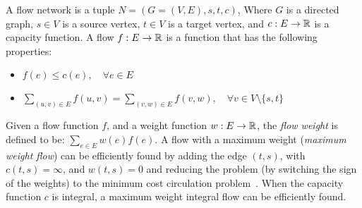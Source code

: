 \label{sec:carpool:preliminary}
A flow network is a tuple $N = (G = (V, E), s, t, c)$, 
Where $G$ is a directed graph, 
$s \in V$ is a source vertex, 
$t \in V$ is a target vertex, 
and $c : E \rightarrow \mathbb{R}$ is a capacity function. 
A flow $f : E \rightarrow \mathbb{R}$ is a function that has the following properties:
\begin{itemize}
\item
$f(e) \leq c(e), \quad \forall e \in E$

\item
$\sum_{(u, v) \in E} f(u, v) = \sum_{(v, w) \in E} f(v, w), \quad \forall v \in V \setminus \{s, t\}$
\end{itemize}

Given a flow function $f$, 
and a weight function $w: E \rightarrow \mathbb{R}$, 
the \emph{flow weight} is defined to be:
$\sum_{e \in E}{w(e)f(e)}$.
A flow with a maximum weight (\emph{maximum weight flow}) can be efficiently found by adding 
the edge $(t, s)$, with $c(t,s) = \infty$, and $w(t,s) = 0$ and reducing the problem
(by switching the sign of the weights) 
to the minimum cost circulation problem~\cite{tardos1985strongly}.
When the capacity function $c$ is integral, 
a maximum weight integral flow can be efficiently found.  

